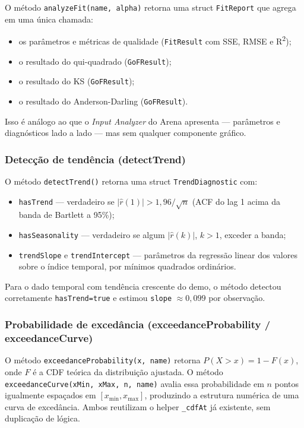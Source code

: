 O método \texttt{analyzeFit(name, alpha)} retorna uma struct \texttt{FitReport} que agrega em uma única chamada:

\begin{itemize}
    \item os parâmetros e métricas de qualidade (\texttt{FitResult} com SSE, RMSE e R\textsuperscript{2});
    \item o resultado do qui-quadrado (\texttt{GoFResult});
    \item o resultado do KS (\texttt{GoFResult});
    \item o resultado do Anderson-Darling (\texttt{GoFResult}).
\end{itemize}

Isso é análogo ao que o \textit{Input Analyzer} do Arena apresenta — parâmetros e diagnósticos lado a lado — mas sem qualquer componente gráfico.

\subsubsection*{Detecção de tendência (detectTrend)}

O método \texttt{detectTrend()} retorna uma struct \texttt{TrendDiagnostic} com:

\begin{itemize}
    \item \texttt{hasTrend} — verdadeiro se $|\hat{r}(1)| > 1{,}96/\sqrt{n}$ (ACF do lag 1 acima da banda de Bartlett a 95\%);
    \item \texttt{hasSeasonality} — verdadeiro se algum $|\hat{r}(k)|$, $k > 1$, exceder a banda;
    \item \texttt{trendSlope} e \texttt{trendIntercept} — parâmetros da regressão linear dos valores sobre o índice temporal, por mínimos quadrados ordinários.
\end{itemize}

Para o dado temporal com tendência crescente do demo, o método detectou corretamente \texttt{hasTrend=true} e estimou \texttt{slope} $\approx 0{,}099$ por observação.

\subsubsection*{Probabilidade de excedância (exceedanceProbability / exceedanceCurve)}

O método \texttt{exceedanceProbability(x, name)} retorna $P(X > x) = 1 - F(x)$, onde $F$ é a CDF teórica da distribuição ajustada. O método \texttt{exceedanceCurve(xMin, xMax, n, name)} avalia essa probabilidade em $n$ pontos igualmente espaçados em $[x_{\min}, x_{\max}]$, produzindo a estrutura numérica de uma curva de excedância. Ambos reutilizam o helper \texttt{\_cdfAt} já existente, sem duplicação de lógica.

